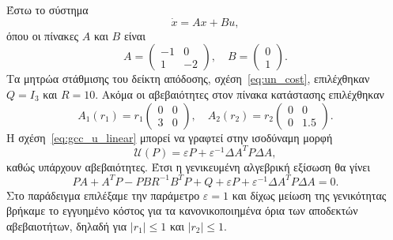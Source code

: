 Έστω το σύστημα
\[
    \dot{x} = Ax + Bu,
\]
όπου οι πίνακες \( A \) και \( B \) είναι
\[
    A =
    \begin{pmatrix}
        -1 & 0 \\
        1 & -2
    \end{pmatrix}, \quad
    B = \begin{pmatrix}0 \\ 1\end{pmatrix}.
\]
Τα μητρώα στάθμισης του δείκτη απόδοσης, σχέση~\eqref{eq:un_cost}, επιλέχθηκαν
\( Q = I_3 \) και \( R = 10 \). Ακόμα οι αβεβαιότητες στον πίνακα κατάστασης
επιλέχθηκαν
\[
    A_1(r_1) =
    r_1\begin{pmatrix}
        0 & 0 \\
        3 & 0
    \end{pmatrix}, \quad
    A_2(r_2) =
    r_2\begin{pmatrix}
        0 & 0 \\
        0 & 1.5
    \end{pmatrix}.
\]
Η σχέση~\eqref{eq:gcc_u_linear} μπορεί να γραφτεί στην ισοδύναμη μορφή
\[
    \mathcal{U}(P) = \varepsilon P + \varepsilon^{-1}\Delta A^{T}P\Delta A,
\]
καθώς υπάρχουν αβεβαιότητες. Έτσι η γενικευμένη αλγεβρική εξίσωση 
θα γίνει
\begin{equation}\label{eq:un_gare_linear}
    PA + A^{T}P - PBR^{-1}B^{T}P + Q + \varepsilon P +
    \varepsilon^{-1}\Delta A^{T}P\Delta A = 0.
\end{equation}
Στο παράδειγμα επιλέξαμε την παράμετρο
\( \varepsilon = 1 \) και δίχως μείωση της γενικότητας βρήκαμε το εγγυημένο
κόστος για τα κανονικοποιημένα όρια των αποδεκτών αβεβαιοτήτων, δηλαδή για
\( |r_1| \leq 1 \) και \( |r_2| \leq 1 \).

